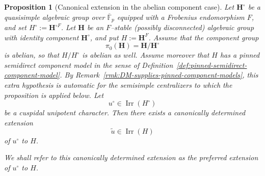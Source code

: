 \documentclass{amsart}
\theoremstyle{plain}
\numberwithin{equation}{section}
\newtheorem{proposition}[theorem]{Proposition}
\theoremstyle{definition}
\newcommand{\Irr}{\operatorname{Irr}}
\begin{document}
\begin{proposition}[Canonical extension in the abelian component case]
\label{prop:preferred-extension-abelian-component}
Let $\mathbf H^\circ$ be a quasisimple algebraic group over $\overline{\mathbb F}_p$
equipped with a Frobenius endomorphism $F$, and set $H^\circ:=\mathbf H^{\circ F}$.
Let $\mathbf H$ be an $F$--stable (possibly disconnected) algebraic group with identity component
$\mathbf H^\circ$, and put $H:=\mathbf H^F$. Assume that the component group
\[
\pi_0(\mathbf H)=\mathbf H/\mathbf H^\circ
\]
is abelian, so that $H/H^\circ$ is abelian as well.  Assume moreover that $H$ has a pinned semidirect
component model in the sense of Definition~\ref{def:pinned-semidirect-component-model}.  By
Remark~\ref{rmk:DM-supplies-pinned-component-models}, this extra hypothesis is automatic for the
semisimple centralizers to which the proposition is applied below. Let
\[
u^\circ\in\Irr(H^\circ)
\]
be a cuspidal unipotent character. Then there exists a canonically determined extension
\[
\widetilde u\in\Irr(H)
\]
of $u^\circ$ to $H$.

We shall refer to this canonically determined extension as the \emph{preferred extension} of
$u^\circ$ to $H$.
\end{proposition}
\end{document}
